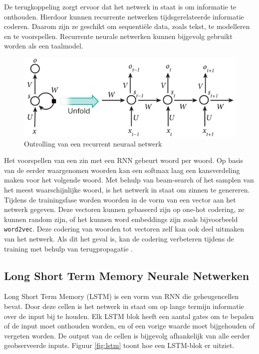 De terugkoppeling zorgt ervoor dat het netwerk in staat is om informatie te onthouden. Hierdoor kunnen recurrente netwerken tijdsgerelateerde informatie coderen. Daarom zijn ze geschikt om sequenti\"ele data, zoals tekst, te modelleren en te voorspellen. Recurrente neurale netwerken kunnen bijgevolg gebruikt worden als een taalmodel.

\begin{figure}[tb]
    \centering
    \includegraphics[width=\linewidth]{Images/rnn.PNG}
    \caption{Ontrolling van een recurrent neuraal netwerk}
    \label{fig:rnn}
\end{figure}

Het voorspellen van een zin met een RNN gebeurt woord per woord. Op basis van de eerder waargenomen woorden kan een softmax laag een kansverdeling maken voor het volgende woord. Met behulp van beam-search of het samplen van het meest waarschijnlijke woord, is het netwerk in staat om zinnen te genereren. Tijdens de trainingsfase worden woorden in de vorm van een vector aan het netwerk gegeven. Deze vectoren kunnen gebaseerd zijn op one-hot codering, ze kunnen random zijn, of het kunnen word embeddings zijn zoals bijvoorbeeld \texttt{word2vec}\cite{Mikolov2013}. Deze codering van woorden tot vectoren zelf kan ook deel uitmaken van het netwerk. Als dit het geval is, kan de codering verbeteren tijdens de training met behulp van terugpropagatie .


\subsection{Long Short Term Memory Neurale Netwerken}
\label{sub:lstm}
Long Short Term Memory (LSTM) is een vorm van RNN die geheugencellen bevat. Door deze cellen is het netwerk in staat om op lange termijn informatie over de input bij te houden. Elk LSTM blok heeft een aantal gates om te bepalen of de input moet onthouden worden, en of een vorige waarde moet bijgehouden of vergeten worden. De output van de cellen is bijgevolg afhankelijk van alle eerder geobserveerde inputs. Figuur \ref{fig:lstm} toont hoe een LSTM-blok er uitziet.\cite{Google}\cite{SeppHochreiter1997}

